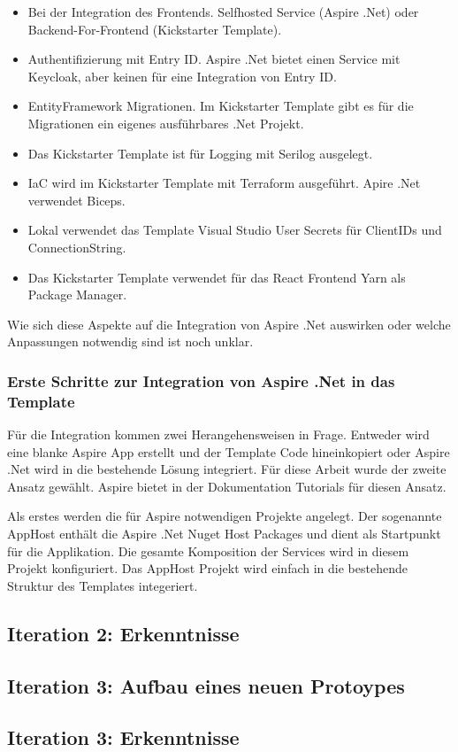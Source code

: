             \begin{itemize}
                \item Bei der Integration des Frontends. Selfhosted Service (Aspire .Net) oder Backend-For-Frontend (Kickstarter Template).
                \item Authentifizierung mit Entry ID. Aspire .Net bietet einen Service mit Keycloak, aber keinen für eine Integration von Entry ID.
                \item EntityFramework Migrationen. Im Kickstarter Template gibt es für die Migrationen ein eigenes ausführbares .Net Projekt.
                \item Das Kickstarter Template ist für Logging mit Serilog ausgelegt.
                \item IaC wird im Kickstarter Template mit Terraform ausgeführt. Apire .Net verwendet Biceps.
                \item Lokal verwendet das Template Visual Studio User Secrets für ClientIDs und ConnectionString.
                \item Das Kickstarter Template verwendet für das React Frontend Yarn als Package Manager.
            \end{itemize}

            Wie sich diese Aspekte auf die Integration von Aspire .Net auswirken oder welche Anpassungen notwendig sind ist noch unklar.

        \subsubsection{Erste Schritte zur Integration von Aspire .Net in das Template}

            Für die Integration kommen zwei Herangehensweisen in Frage. Entweder wird eine blanke Aspire App erstellt und der Template Code hineinkopiert oder Aspire .Net wird in die bestehende Lösung integriert. Für diese Arbeit wurde der zweite Ansatz gewählt. Aspire bietet in der Dokumentation Tutorials für diesen Ansatz.

            Als erstes werden die für Aspire notwendigen Projekte angelegt. Der sogenannte AppHost enthält die Aspire .Net Nuget Host Packages und dient als Startpunkt für die Applikation. Die gesamte Komposition der Services wird in diesem Projekt konfiguriert. Das AppHost Projekt wird einfach in die bestehende Struktur des Templates integeriert.
            
            
            

    \subsection{Iteration 2: Erkenntnisse}

    \subsection{Iteration 3: Aufbau eines neuen Protoypes}

    \subsection{Iteration 3: Erkenntnisse}



